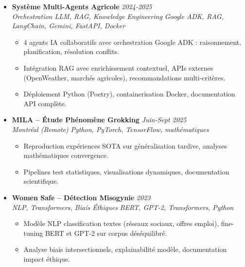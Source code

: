 \documentclass[a4paper,11pt]{article}
\begin{document}
\begin{itemize}[leftmargin=*, label={-}]
    \item \textbf{Syst\`eme Multi-Agents Agricole} \hfill \textit{2024-2025} \\
    \textit{Orchestration LLM, RAG, Knowledge Engineering} \hfill \textit{Google ADK, RAG, LangChain, Gemini, FastAPI, Docker}
    \vspace{-2pt}
    \begin{itemize}[leftmargin=0.4cm, nosep, label=\tiny$\bullet$]
        \item \small{4 agents IA collaboratifs avec orchestration Google ADK : raisonnement, planification, r\'esolution conflits.}
        \item \small{Intégration RAG avec enrichissement contextuel, APIs externes (OpenWeather, marchés agricoles), recommandations multi-crit\`eres.}
        \item \small{D\'eploiement Python (Poetry), containerisation Docker, documentation API compl\`ete.}
    \end{itemize}
    \vspace{3pt}

    \item \textbf{MILA -- Étude Ph\'enomène Grokking} \hfill \textit{Juin-Sept 2025} \\
    \textit{Montr\'eal (Remote)} \hfill \textit{Python, PyTorch, TensorFlow, math\'ematiques}
    \vspace{-2pt}
    \begin{itemize}[leftmargin=0.4cm, nosep, label=\tiny$\bullet$]
        \item \small{Reproduction exp\'eriences SOTA sur g\'en\'eralisation tardive, analyses math\'ematiques convergence.}
        \item \small{Pipelines test statistiques, visualisations dynamiques, documentation scientifique.}
    \end{itemize}
    \vspace{3pt}

    \item \textbf{Women Safe -- D\'etection Misogynie} \hfill \textit{2023} \\
    \textit{NLP, Transformers, Biais \'Ethiques} \hfill \textit{BERT, GPT-2, Transformers, Python}
    \vspace{-2pt}
    \begin{itemize}[leftmargin=0.4cm, nosep, label=\tiny$\bullet$]
        \item \small{Mod\`ele NLP classification textes (r\'eseaux sociaux, offres emploi), fine-tuning BERT et GPT-2 sur corpus d\'es\'equilibr\'e.}
        \item \small{Analyse biais intersectionnels, explainabilit\'e mod\`ele, documentation impact \'ethique.}
    \end{itemize}
    \vspace{3pt}


\end{itemize}
\end{document}
